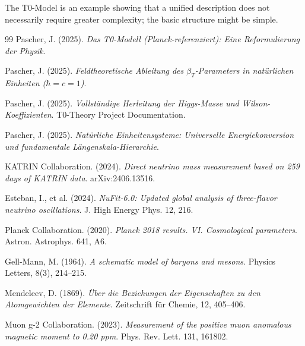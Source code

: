 	The T0-Model is an example showing that a unified description does not necessarily require greater complexity; the basic structure might be simple.
	
	\begin{thebibliography}{99}
		Pascher, J. (2025). \textit{Das T0-Modell (Planck-referenziert): Eine Reformulierung der Physik}. 
		
		Pascher, J. (2025). \textit{Feldtheoretische Ableitung des $\beta_T$-Parameters in natürlichen Einheiten ($\hbar = c = 1$)}. 
		
		Pascher, J. (2025). \textit{Vollständige Herleitung der Higgs-Masse und Wilson-Koeffizienten}. T0-Theory Project Documentation.
		
		Pascher, J. (2025). \textit{Natürliche Einheitensysteme: Universelle Energiekonversion und fundamentale Längenskala-Hierarchie}. 
		
		KATRIN Collaboration. (2024). \textit{Direct neutrino mass measurement based on 259 days of KATRIN data}. arXiv:2406.13516.
		
		Esteban, I., et al. (2024). \textit{NuFit-6.0: Updated global analysis of three-flavor neutrino oscillations}. J. High Energy Phys. 12, 216.
		
		Planck Collaboration. (2020). \textit{Planck 2018 results. VI. Cosmological parameters}. Astron. Astrophys. 641, A6.
		
		Gell-Mann, M. (1964). \textit{A schematic model of baryons and mesons}. Physics Letters, 8(3), 214--215.
		
		Mendeleev, D. (1869). \textit{Über die Beziehungen der Eigenschaften zu den Atomgewichten der Elemente}. Zeitschrift für Chemie, 12, 405--406.
		
		Muon g-2 Collaboration. (2023). \textit{Measurement of the positive muon anomalous magnetic moment to 0.20 ppm}. Phys. Rev. Lett. 131, 161802.
		
	\end{thebibliography}


